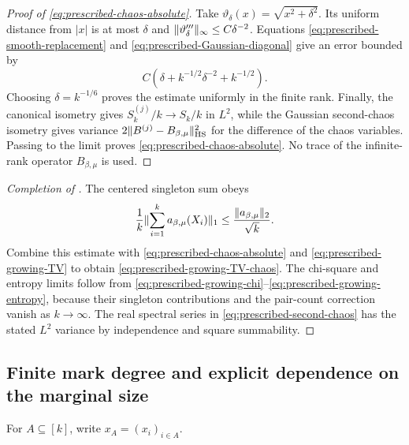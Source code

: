 \documentclass[11pt,reqno]{amsart}
\numberwithin{equation}{section}
\theoremstyle{plain}
\theoremstyle{definition}
\DeclarePairedDelimiter{\norm}{\lVert}{\rVert}
\newcommand{\HS}{\mathrm{HS}}
\newcommand{\be}{\beta}
\begin{document}
\begin{proof}[Proof of \eqref{eq:prescribed-chaos-absolute}]
Take $\vartheta_\delta(x)=\sqrt{x^2+\delta^2}$.  Its uniform distance from $|x|$ is at most $\delta$ and $\norm{\vartheta_\delta'''}_\infty\leq C\delta^{-2}$.  Equations \eqref{eq:prescribed-smooth-replacement} and \eqref{eq:prescribed-Gaussian-diagonal} give an error bounded by
\begin{equation}
 C\left(\delta+k^{-1/2}\delta^{-2}+k^{-1/2}\right).
 \label{eq:prescribed-smoothed-absolute-error}
\end{equation}
Choosing $\delta=k^{-1/6}$ proves the estimate uniformly in the finite rank.  Finally, the canonical isometry gives $S_k^{(j)}/k\to S_k/k$ in $L^2$, while the Gaussian second-chaos isometry gives variance $2\norm{B^{(j)}-B_{\be,\mu}}_{\HS}^2$ for the difference of the chaos variables.  Passing to the limit proves \eqref{eq:prescribed-chaos-absolute}.  No trace of the infinite-rank operator $B_{\be,\mu}$ is used.
\end{proof}

\begin{proof}[Completion of ]
The centered singleton sum obeys
\begin{equation}
 \frac1k\norm{\sum_{i=1}^ka_{\be,\mu}(X_i)}_1
 \leq\frac{\norm{a_{\be,\mu}}_2}{\sqrt{k}}.
 \label{eq:prescribed-singleton-absolute-bound}
\end{equation}
Combine this estimate with \eqref{eq:prescribed-chaos-absolute} and \eqref{eq:prescribed-growing-TV} to obtain \eqref{eq:prescribed-growing-TV-chaos}.  The chi-square and entropy limits follow from \eqref{eq:prescribed-growing-chi}--\eqref{eq:prescribed-growing-entropy}, because their singleton contributions and the pair-count correction vanish as $k\to\infty$.  The real spectral series in \eqref{eq:prescribed-second-chaos} has the stated $L^2$ variance by independence and square summability.
\end{proof}

\subsection{Finite mark degree and explicit dependence on the marginal size}
\label{subsec:prescribed-mark-degree}

For $A\subseteq[k]$, write $x_A=(x_i)_{i\in A}$.
\end{document}
